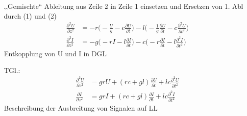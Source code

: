 \documentclass[titlepage,12pt,a4paper,ngerman]{report}
\begin{document}
,,Gemischte`` Ableitung aus Zeile 2 in Zeile 1 einsetzen und Ersetzen von 1. Abl durch (1) und (2)
\begin{align*}
\frac{\partial ^2 U}{\partial z^2} &= - r \bigg( - \frac{U}{g} - c \frac{\partial U}{\partial t} \bigg) - l \bigg( -\frac{1}{g} \frac{\partial U}{\partial t} - c \frac{\partial ^2 U}{\partial t^2} \bigg)\\
\frac{\partial ^2 I}{\partial z^2} &= - g\bigg( - r I - l \frac{\partial I}{\partial t} \bigg) - c \bigg( - r \frac{\partial I}{\partial t} - l \frac{\partial ^2 I}{\partial t^2} \bigg)
\end{align*}
Entkopplung von U und I in DGL

TGl.:
\begin{align*}
\frac{\partial^2 U}{\partial z^2} &= gr U + (rc+gl) \frac{\partial U}{\partial t} + lc \frac{\partial ^2 U}{\partial t^2}\\
\frac{\partial I}{\partial z^2} &= grI + (rc + gl) \frac{\partial I}{\partial t} + lc \frac{\partial ^2 I}{\partial t^2}
\end{align*}
Beschreibung der Ausbreitung von Signalen auf LL
\end{document}
